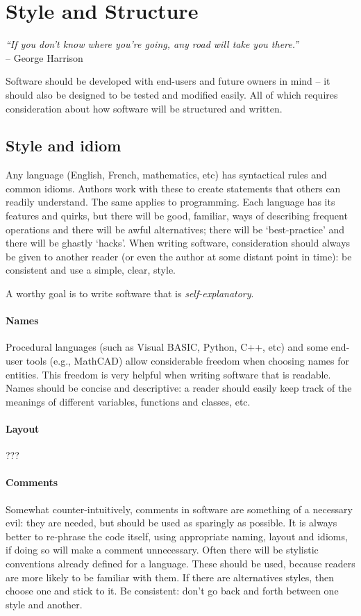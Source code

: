 \section{Style and Structure}
\begin{flushright}
\textit{“If you don’t know where you’re going, any road will take you there.”} \\
-- George Harrison 
\end{flushright}


Software should be developed with end-users and future owners in mind – it should also be designed to be tested and modified easily. All of which requires consideration about how software will be structured and written.

\subsection{Style and idiom}
Any language (English, French, mathematics, etc) has syntactical rules and common idioms. Authors work with these to create statements that others can readily understand. The same applies to programming. Each language has its features and quirks, but there will be good, familiar, ways of describing frequent operations and there will be awful alternatives; there will be `best-practice' and there will be ghastly `hacks'. When writing software, consideration should always be given to another reader (or even the author at some distant point in time): be consistent and use a simple, clear, style.

A worthy goal is to write software that is \textit{self-explanatory}. 

\paragraph{Names}
Procedural languages (such as Visual BASIC, Python, C++, etc) and some end-user tools (e.g., MathCAD) allow considerable freedom when choosing names for entities. This freedom is very helpful when writing software that is readable. Names should be concise and descriptive: a reader should easily keep track of the meanings of different variables, functions and classes, etc.

\paragraph{Layout} ???

\paragraph{Comments}
Somewhat counter-intuitively, comments in software are something of a necessary evil: they are needed, but should be used as sparingly as possible. It is always better to re-phrase the code itself, using appropriate naming, layout and idioms, if doing so will make a comment unnecessary.
Often there will be stylistic conventions already defined for a language. These should be used, because readers are more likely to be familiar with them. If there are alternatives styles, then choose one and stick to it. Be consistent: don’t go back and forth between one style and another.  

